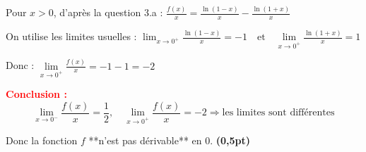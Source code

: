 \documentclass[12pt]{article}
\begin{document}
\begin{enumerate}
\begin{enumerate}
Pour \( x > 0 \), d’après la question 3.a : \( \frac{f(x)}{x} = \frac{\ln(1 - x)}{x} - \frac{\ln(1 + x)}{x} \)

On utilise les limites usuelles : \( \lim_{x \to 0^+} \frac{\ln(1 - x)}{x} = -1
\quad \text{et} \quad
\lim\limits_{x \to 0^+} \frac{\ln(1 + x)}{x} = 1 \)

Donc : \( \lim\limits_{x \to 0^+} \frac{f(x)}{x} = -1 - 1 = -2 \)

\textcolor{red}{\textbf{Conclusion :}}\\
\[
\lim_{x \to 0^-} \frac{f(x)}{x} = \frac{1}{2}, \quad
\lim_{x \to 0^+} \frac{f(x)}{x} = -2
\Rightarrow \text{les limites sont différentes}
\]

Donc la fonction \( f \) **n’est pas dérivable** en 0. \hfill \textbf{(0,5pt)}

\end{enumerate}

\end{enumerate}
\end{document}
